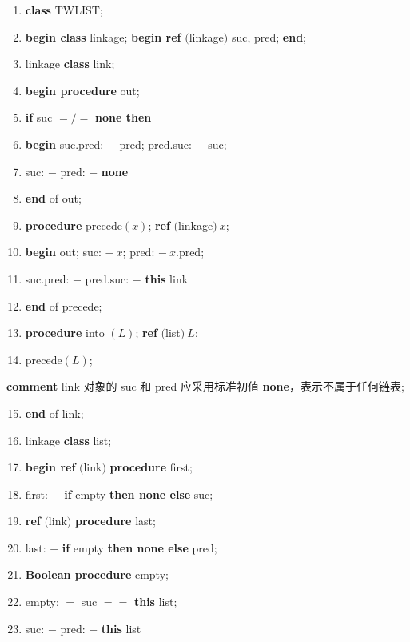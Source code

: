 \begin{enumerate}[nosep, label=\arabic*.]
	\item \textbf{class} TWLIST;
	\item \textbf{begin class} linkage; \textbf{begin ref} $($linkage$)$ suc, pred; \textbf{end};
	\item \quad linkage \textbf{class} link;
	\item \quad \textbf{begin procedure} out;
	\item \quad \quad \textbf{if} suc $=/=$ \textbf{none then}
	\item \quad \quad \textbf{begin} suc.pred: $-$ pred; pred.suc: $-$ suc;
	\item \quad \quad \quad suc: $-$ pred: $-$ \textbf{none}
	\item \quad \quad \textbf{end} of out;
	\item \quad \quad \textbf{procedure} precede$(x)$; \textbf{ref} $($linkage$)\ x$;
	\item \quad \quad \textbf{begin} out; suc: $-\ x$; pred: $-\ x$.pred;
	\item \quad \quad \quad suc.pred: $-$ pred.suc: $-$ \textbf{this} link
	\item \quad \quad \textbf{end} of precede;
	\item \quad \quad \textbf{procedure} into $(L)$; \textbf{ref} $($list$)\ L$;
	\item \quad \quad \quad precede$(L)$;
\end{enumerate}

\parindent\quad \quad \quad \textbf{comment} link 对象的 suc 和 pred 应采用标准初值 \textbf{none}，表示不属于任何链表;

\begin{enumerate}[nosep, label=\arabic*.]
	\setcounter{enumi}{14}
	\item \quad \textbf{end} of link;
	\item \quad linkage \textbf{class} list;
	\item \quad \textbf{begin ref} $($link$)$ \textbf{procedure} first;
	\item \quad \quad \quad first: $-$ \textbf{if} empty \textbf{then none else} suc;
	\item \quad \quad \textbf{ref} $($link$)$ \textbf{procedure} last;
	\item \quad \quad \quad last: $-$ \textbf{if} empty \textbf{then none else} pred;
	\item \quad \quad \textbf{Boolean procedure} empty;
	\item \quad \quad \quad empty: $=$ suc $==$ \textbf{this} list;
	\item \quad \quad \quad suc: $-$ pred: $-$ \textbf{this} list
\end{enumerate}

